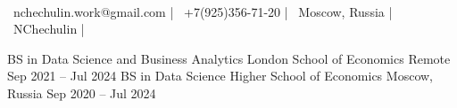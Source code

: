 \documentclass[a4paper, 10pt]{awesome-cv}
\begin{document}
\begin{center}
	  \\
	\vspace{2mm}
	{\faEnvelope\ nchechulin.work@gmail.com} | {\faMobile\ +7(925)356-71-20} | {\faMapMarker\ Moscow, Russia} | {\faGithub\ NChechulin} | {\faTelegram\ \@NChechulin}
\end{center}
\vspace{-2mm}
\begin{cventries}
	\cventry
	{BS in Data Science and Business Analytics}
	{London School of Economics}
	{Remote}
	{Sep 2021 – Jul 2024}
	{}
	\cventry
	{BS in Data Science}
	{Higher School of Economics}
	{Moscow, Russia}
	{Sep 2020 – Jul 2024}
	{}
\end{cventries}
\end{document}
